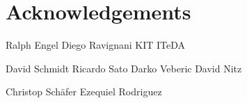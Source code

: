 
\chapter{Acknowledgements}

Ralph Engel
Diego Ravignani
KIT ITeDA

David Schmidt
Ricardo Sato
Darko Veberic
David Nitz

Christop Schäfer
Ezequiel Rodriguez
